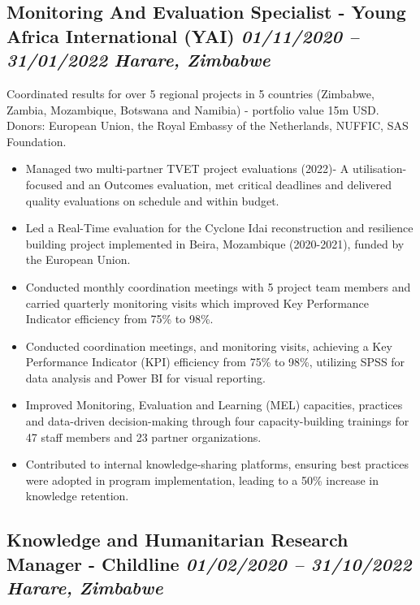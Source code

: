 \documentclass[
  10pt,
]{article}
\providecommand{\tightlist}{%
  \setlength{\itemsep}{0pt}\setlength{\parskip}{0pt}}
\begin{document}
\subsection{\texorpdfstring{Monitoring And Evaluation Specialist - Young
Africa International (YAI) \emph{01/11/2020 -- 31/01/2022} \textbar{}
\emph{Harare, Zimbabwe}}{Monitoring And Evaluation Specialist - Young Africa International (YAI) 01/11/2020 -- 31/01/2022 \textbar{} Harare, Zimbabwe}}\label{monitoring-and-evaluation-specialist---young-africa-international-yai-01112020-31012022-harare-zimbabwe}

Coordinated results for over 5 regional projects in 5 countries (Zimbabwe, Zambia, Mozambique, Botswana and Namibia) - portfolio value 15m USD. Donors: European Union, the Royal Embassy of the Netherlands, NUFFIC, SAS Foundation.

\begin{itemize}
\tightlist
\item
Managed two multi-partner TVET project evaluations (2022)- A utilisation-focused and an Outcomes evaluation, met critical deadlines and delivered quality evaluations on schedule and within budget.
\item
Led a Real-Time evaluation for the Cyclone Idai reconstruction and resilience building project implemented in Beira, Mozambique (2020-2021), funded by the European Union.
\item
Conducted monthly coordination meetings with 5 project team members and carried quarterly monitoring visits which improved Key Performance Indicator efficiency from 75\% to 98\%.
\item
Conducted coordination meetings, and monitoring visits, achieving a Key Performance Indicator (KPI) efficiency from 75\% to 98\%, utilizing SPSS for data analysis and Power BI for visual reporting.
\item
Improved Monitoring, Evaluation and Learning (MEL) capacities, practices and data-driven decision-making through four capacity-building trainings for 47 staff members and 23 partner organizations.
\item
Contributed to internal knowledge-sharing platforms, ensuring best practices were adopted in program implementation, leading to a 50\% increase in knowledge retention.
\end{itemize}

\subsection{\texorpdfstring{Knowledge and Humanitarian Research Manager - Childline \emph{01/02/2020 -- 31/10/2022} \textbar{} \emph{Harare, Zimbabwe}}{Knowledge and Humanitarian Research Manager - Childline 01/02/2020 -- 31/10/2022 \textbar{} Harare, Zimbabwe}}\label{knowledge-and-humanitarian-research-manager---childline-01022020-31102022-harare-zimbabwe}
\end{document}
